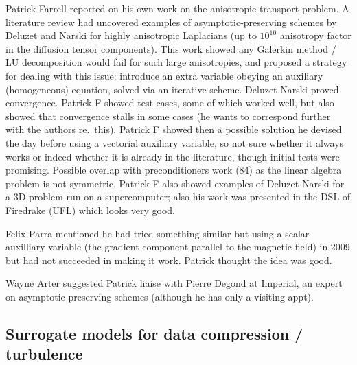 Patrick Farrell reported on his own work on the anisotropic transport problem.  
A literature review had uncovered examples of asymptotic-preserving schemes by 
Deluzet and Narski for highly anisotropic Laplacians (up to $10^{10}$ 
anisotropy factor in the diffusion tensor components).  This work showed any 
Galerkin method / LU decomposition would fail for such large anisotropies, and 
proposed a strategy for dealing with this issue: introduce an extra variable 
obeying an auxiliary (homogeneous) equation, solved via an iterative scheme.  
Deluzet-Narski proved convergence.  Patrick F showed test cases, some of which 
worked well, but also showed that convergence stalls in some cases (he wants to 
correspond further with the authors re.\ this).  Patrick F showed then a possible 
solution he devised the day before using a vectorial auxiliary variable, so not 
sure whether it always works or indeed whether it is already in the literature, 
though initial tests were promising.  Possible overlap with preconditioners 
work (84) as the linear algebra problem is not symmetric.  Patrick F also 
showed examples of Deluzet-Narski for a 3D problem run on a supercomputer; also 
his work was presented in the DSL of Firedrake (UFL)  which looks very good.

Felix Parra mentioned he had tried something similar but using a scalar 
auxilliary variable (the gradient component parallel to the magnetic field) in 
2009 but had not succeeded in making it work.  Patrick thought the idea was 
good.

Wayne Arter suggested Patrick liaise with Pierre Degond at Imperial, an expert 
on asymptotic-preserving schemes (although he has only a visiting appt).
 



\subsection{Surrogate models for data compression / turbulence}

